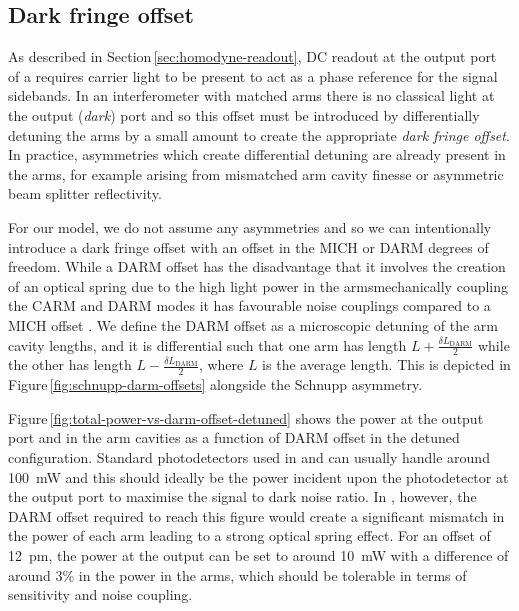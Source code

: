 \subsection{Dark fringe offset}
As described in Section\,\ref{sec:homodyne-readout}, \gls{DC} readout at the output port of a \DRFPMI{} requires carrier light to be present to act as a phase reference for the signal sidebands. In an interferometer with matched arms there is no classical light at the output (\emph{dark}) port and so this offset must be introduced by differentially detuning the arms by a small amount to create the appropriate \emph{dark fringe offset}. In practice, asymmetries which create differential detuning are already present in the arms, for example arising from mismatched arm cavity finesse or asymmetric beam splitter reflectivity.

For our model, we do not assume any asymmetries and so we can intentionally introduce a dark fringe offset with an offset in the \gls{MICH} or \gls{DARM} degrees of freedom. While a \gls{DARM} offset has the disadvantage that it involves the creation of an optical spring due to the high light power in the arms\textemdash mechanically coupling the \gls{CARM} and \gls{DARM} modes \cite{Heidmann2011, Vostrosablin2014}\textemdash it has favourable noise couplings compared to a \gls{MICH} offset \cite{Vajente2011}. We define the \gls{DARM} offset as a microscopic detuning of the arm cavity lengths, and it is differential such that one arm has length $L + \frac{\delta L_{\text{DARM}}}{2}$ while the other has length $L - \frac{\delta L_{\text{DARM}}}{2}$, where $L$ is the average length. This is depicted in Figure\,\ref{fig:schnupp-darm-offsets} alongside the Schnupp asymmetry.

Figure\,\ref{fig:total-power-vs-darm-offset-detuned} shows the power at the output port and in the arm cavities as a function of \gls{DARM} offset in the detuned configuration. Standard photodetectors used in \ALIGO{} and \AVIRGO{} can usually handle around \SI{100}{\milli\watt} and this should ideally be the power incident upon the photodetector at the output port to maximise the signal to dark noise ratio. In \ETLF{}, however, the \gls{DARM} offset required to reach this figure would create a significant mismatch in the power of each arm leading to a strong optical spring effect. For an offset of \SI{12}{\pico\meter}, the power at the output can be set to around \SI{10}{\milli\watt} with a difference of around 3\% in the power in the arms, which should be tolerable in terms of sensitivity and noise coupling.

